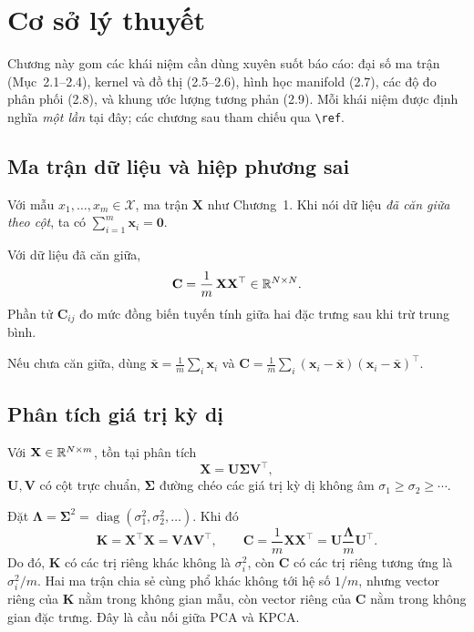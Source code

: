 \section{Cơ sở lý thuyết}

Chương này gom các khái niệm cần dùng xuyên suốt báo cáo: đại số ma trận (Mục~2.1--2.4), kernel và đồ thị (2.5--2.6), hình học manifold (2.7), các độ đo phân phối (2.8), và khung ước lượng tương phản (2.9). Mỗi khái niệm được định nghĩa \emph{một lần} tại đây; các chương sau tham chiếu qua \texttt{\textbackslash ref}.

\subsection{Ma trận dữ liệu và hiệp phương sai}

Với mẫu $x_1,\ldots,x_m \in \mathcal{X}$, ma trận $\mathbf{X}$ như Chương~1. Khi nói dữ liệu \emph{đã căn giữa theo cột}, ta có $\sum_{i=1}^m \mathbf{x}_i = \mathbf{0}$.

\begin{definition}
Với dữ liệu đã căn giữa,
\[
\mathbf{C} = \frac{1}{m}\,\mathbf{X}\mathbf{X}^\top \in \mathbb{R}^{N \times N}.
\]
Phần tử $\mathbf{C}_{ij}$ đo mức đồng biến tuyến tính giữa hai đặc trưng sau khi trừ trung bình.
\end{definition}

Nếu chưa căn giữa, dùng $\bar{\mathbf{x}} = \frac{1}{m}\sum_i \mathbf{x}_i$ và
$\mathbf{C} = \frac{1}{m}\sum_i (\mathbf{x}_i - \bar{\mathbf{x}})(\mathbf{x}_i - \bar{\mathbf{x}})^\top$.

\subsection{Phân tích giá trị kỳ dị}

\begin{definition}[SVD]
Với $\mathbf{X} \in \mathbb{R}^{N \times m}$, tồn tại phân tích
\[
\mathbf{X} = \mathbf{U}\boldsymbol{\Sigma}\mathbf{V}^\top,
\]
$\mathbf{U},\mathbf{V}$ có cột trực chuẩn, $\boldsymbol{\Sigma}$ đường chéo các giá trị kỳ dị không âm $\sigma_1 \geq \sigma_2 \geq \cdots$.
\end{definition}

Đặt $\boldsymbol{\Lambda} = \boldsymbol{\Sigma}^2 = \operatorname{diag}(\sigma_1^2,\sigma_2^2,\ldots)$. Khi đó
\[
\mathbf{K} = \mathbf{X}^\top\mathbf{X} = \mathbf{V}\boldsymbol{\Lambda}\mathbf{V}^\top,
\qquad
\mathbf{C} = \frac{1}{m}\mathbf{X}\mathbf{X}^\top = \mathbf{U}\frac{\boldsymbol{\Lambda}}{m}\mathbf{U}^\top.
\]
Do đó, $\mathbf{K}$ có các trị riêng khác không là $\sigma_i^2$, còn $\mathbf{C}$ có các trị riêng tương ứng là $\sigma_i^2/m$. Hai ma trận chia sẻ cùng phổ khác không tới hệ số $1/m$, nhưng vector riêng của $\mathbf{K}$ nằm trong không gian mẫu, còn vector riêng của $\mathbf{C}$ nằm trong không gian đặc trưng. Đây là cầu nối giữa PCA và KPCA.

